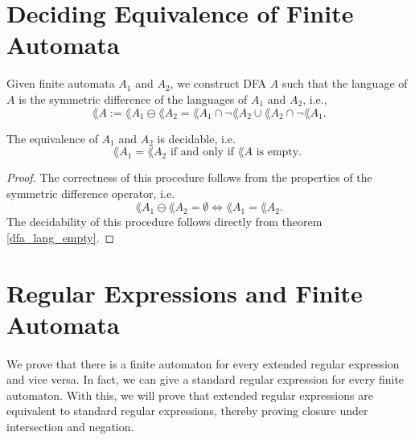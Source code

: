 \section{Deciding Equivalence of Finite Automata}
Given finite automata $A_1$ and $A_2$, we construct DFA $A$ such that the language of $A$ is the symmetric difference of the languages of $A_1$ and $A_2$, i.e.,
\begin{equation*}          
    \lang{A} := \lang{A_1} \ominus \lang{A_2} = \lang{A_1} \cap \neg \lang{A_2} \cup \lang{A_2} \cap \neg \lang{A_1}.      
\end{equation*}
\begin{theorem} The equivalence of $A_1$ and $A_2$ is decidable, i.e.
    \label{dfa_sym_diff_correct}
    \begin{equation*}                
        \lang{A_1} = \lang{A_2} \mbox{ if and only if } \lang{A} \mbox{ is empty. }                
    \end{equation*}
\end{theorem}
\begin{proof}
    The correctness of this procedure follows from the properties of the symmetric difference operator, i.e.
    \begin{equation*}                  
        \lang{A_1} \ominus \lang{A_2} = \emptyset \Leftrightarrow \lang{A_1} = \lang{A_2}.                  
    \end{equation*}
    The decidability of this procedure follows directly from theorem \ref{dfa_lang_empty}.
\end{proof}


\section{Regular Expressions and Finite Automata}

\paragraph{} 
We prove that there is a finite automaton for every extended regular expression and vice versa. 
In fact, we can give a standard regular expression for every finite automaton.
With this, we will prove that extended regular expressions are equivalent to standard regular expressions, 
thereby proving closure under intersection and negation.


